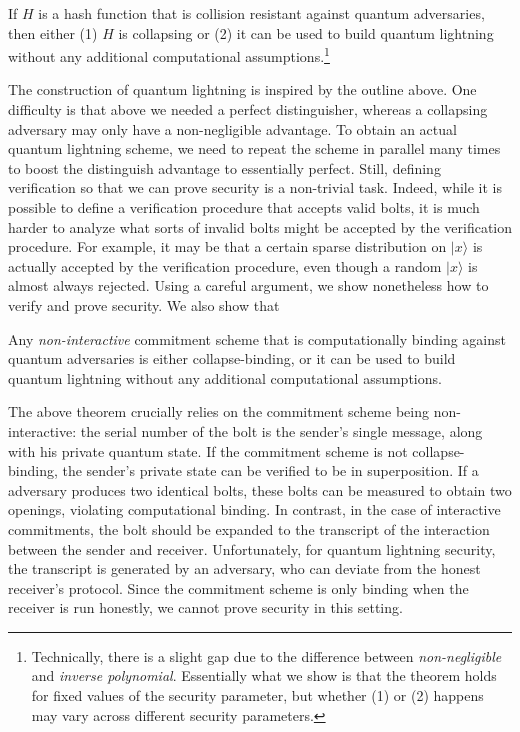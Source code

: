 \begin{theorem}[informal] If $H$ is a hash function that is collision resistant against quantum adversaries, then either (1) $H$ is collapsing or (2) it can be used to build quantum lightning without any additional computational assumptions.\footnote{Technically, there is a slight gap due to the difference between \emph{non-negligible} and \emph{inverse polynomial}.  Essentially what we show is that the theorem holds for fixed values of the security parameter, but whether (1) or (2) happens may vary across different security parameters.}
\end{theorem}
The construction of quantum lightning is inspired by the outline above.  One difficulty is that above we needed a perfect distinguisher, whereas a collapsing adversary may only have a non-negligible advantage.  To obtain an actual quantum lightning scheme, we need to repeat the scheme in parallel many times to boost the distinguish advantage to essentially perfect.  Still, defining verification so that we can prove security is a non-trivial task.  Indeed, while it is possible to define a verification procedure that accepts valid bolts, it is much harder to analyze what sorts of invalid bolts might be accepted by the verification procedure.  For example, it may be that a certain sparse distribution on $|x\rangle$ is actually accepted by the verification procedure, even though a random $|x\rangle$ is almost always rejected.  Using a careful argument, we show nonetheless how to verify and prove security.  We also show that

\begin{theorem}[informal] Any \emph{non-interactive} commitment scheme that is computationally binding against quantum adversaries is either collapse-binding, or it can be used to build quantum lightning without any additional computational assumptions.
\end{theorem}

The above theorem crucially relies on the commitment scheme being non-interactive: the serial number of the bolt is the sender's single message, along with his private quantum state.  If the commitment scheme is not collapse-binding, the sender's private state can be verified to be in superposition.  If a adversary produces two identical bolts, these bolts can be measured to obtain two openings, violating computational binding.  In contrast, in the case of interactive commitments, the bolt should be expanded to the transcript of the interaction between the sender and receiver.  Unfortunately, for quantum lightning security, the transcript is generated by an adversary, who can deviate from the honest receiver's protocol.  Since the commitment scheme is only binding when the receiver is run honestly, we cannot prove security in this setting.

